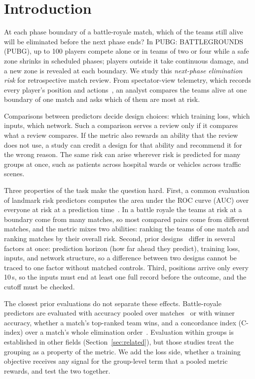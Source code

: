 \documentclass[sigconf,anonymous]{acmart}
\begin{document}
\section{Introduction}
\label{sec:introduction}
At each phase boundary of a battle-royale match, which of the teams still alive will be eliminated before the next phase ends? In PUBG: BATTLEGROUNDS (PUBG), up to 100 players compete alone or in teams of two or four while a safe zone shrinks in scheduled phases; players outside it take continuous damage, and a new zone is revealed at each boundary. We study this \emph{next-phase elimination risk} for retrospective match review. From spectator-view telemetry, which records every player's position and actions~\cite{PUBGAPI}, an analyst compares the teams alive at one boundary of one match and asks which of them are most at risk.

Comparisons between predictors decide design choices: which training loss, which inputs, which network. Such a comparison serves a review only if it compares what a review compares. If the metric also rewards an ability that the review does not use, a study can credit a design for that ability and recommend it for the wrong reason. The same risk can arise wherever risk is predicted for many groups at once, such as patients across hospital wards or vehicles across traffic scenes.

Three properties of the task make the question hard. First, a common evaluation of landmark risk predictors computes the area under the ROC curve (AUC) over everyone at risk at a prediction time~\cite{vanHouwelingen07,HeagertyZheng05}. In a battle royale the teams at risk at a boundary come from many matches, so most compared pairs come from different matches, and the metric mixes two abilities: ranking the teams of one match and ranking matches by their overall risk. Second, prior designs~\cite{Sagong25a,KRAFTON} differ in several factors at once: prediction horizon (how far ahead they predict), training loss, inputs, and network structure, so a difference between two designs cannot be traced to one factor without matched controls. Third, positions arrive only every 10\,s, so the inputs must end at least one full record before the outcome, and the cutoff must be checked.

The closest prior evaluations do not separate these effects. Battle-royale predictors are evaluated with accuracy pooled over matches~\cite{Sagong25a} or with winner accuracy, whether a match's top-ranked team wins, and a concordance index (C-index) over a match's whole elimination order~\cite{KRAFTON}. Evaluation within groups is established in other fields (Section~\ref{sec:related}), but those studies treat the grouping as a property of the metric. We add the loss side, whether a training objective receives any signal for the group-level term that a pooled metric rewards, and test the two together.
\end{document}
